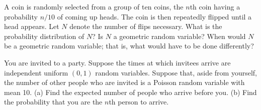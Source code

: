 \begin{exercise}
\label{ex:conditioning-expectation-54}
    A coin is randomly selected from a group of ten coins, the $n$th coin having a probability $n/10$ of coming up heads. The coin is then repeatedly flipped until a head appears. Let $N$ denote the number of flips necessary. What is the probability distribution of $N$? Is $N$ a geometric random variable? When would $N$ be a geometric random variable; that is, what would have to be done differently?
\end{exercise}


\begin{exercise}
\label{ex:conditioning-expectation-55}
    You are invited to a party. Suppose the times at which invitees arrive are independent uniform $(0,1)$ random variables. Suppose that, aside from yourself, the number of other people who are invited is a Poisson random variable with mean 10.
    (a) Find the expected number of people who arrive before you.
    (b) Find the probability that you are the $n$th person to arrive.
\end{exercise}


